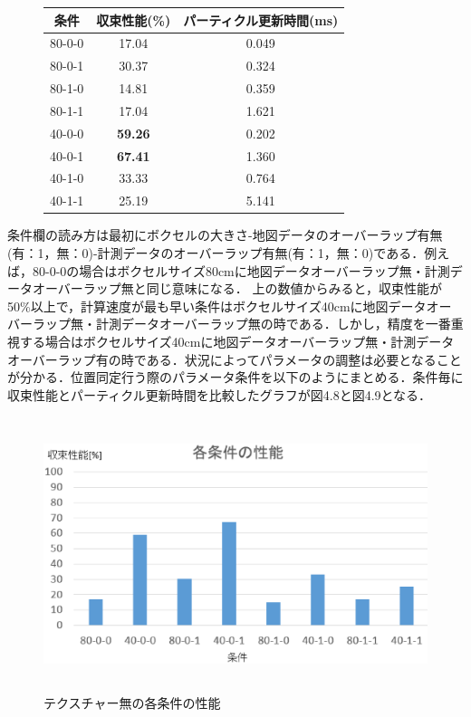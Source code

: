 %
\begin{figure}[htbp]
\begin{center}
\begin{tabular}{ccc} \hline
条件 & 収束性能(\%) &  パーティクル更新時間(ms)\\ \hline \hline
80-0-0 & 17.04 & 0.049\\ \hline
80-0-1 & 30.37 & 0.324\\ \hline
80-1-0 & 14.81 & 0.359\\ \hline
80-1-1 & 17.04 & 1.621\\ \hline
40-0-0 & \bf 59.26 & 0.202\\ \hline
40-0-1 & \bf 67.41 & 1.360\\ \hline
40-1-0 & 33.33 & 0.764\\ \hline
40-1-1 & 25.19 & 5.141\\ \hline
\end{tabular}
\end{center}
\end{figure}
%
条件欄の読み方は最初にボクセルの大きさ-地図データのオーバーラップ有無(有：1，無：0)-計測データのオーバーラップ有無(有：1，無：0)である．例えば，80-0-0の場合はボクセルサイズ80cmに地図データオーバーラップ無・計測データオーバーラップ無と同じ意味になる．
上の数値からみると，収束性能が50\%以上で，計算速度が最も早い条件はボクセルサイズ40cmに地図データオーバーラップ無・計測データオーバーラップ無の時である．しかし，精度を一番重視する場合はボクセルサイズ40cmに地図データオーバーラップ無・計測データオーバーラップ有の時である．状況によってパラメータの調整は必要となることが分かる．位置同定行う際のパラメータ条件を以下のようにまとめる．条件毎に収束性能とパーティクル更新時間を比較したグラフが図4.8と図4.9となる．

%
\begin{figure}[htbp]
  \begin{center}
   \includegraphics[height=80mm]{figure/各条件の性能.eps}
   \caption{テクスチャー無の各条件の性能}
   \label{各条件の性能}
  \end{center}
\end{figure}
%

